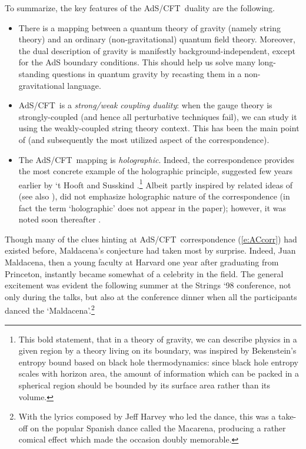 \documentclass[12pt,a4paper]{article}
\def\req#1{(\ref{#1})}
\def\AC{AdS/CFT}
\begin{document}
To summarize, the key features of the \AC\ duality are the following.
\begin{itemize}
\item 
There is a mapping between a quantum theory of gravity (namely string theory) and an ordinary (non-gravitational) quantum field theory.  Moreover, the dual description of gravity is manifestly background-independent, except for the AdS boundary conditions.
This should help us solve many long-standing questions in quantum gravity by recasting them in a non-gravitational language.
\item 
\AC\ is a {\it strong/weak coupling duality}: when the gauge theory is strongly-coupled (and hence all perturbative techniques fail), we can study it using the weakly-coupled string theory context.  This has been the main point of \cite{Maldacena:1997re} (and subsequently the most utilized aspect of the correspondence).
\item
The \AC\ mapping is {\it holographic}.  Indeed, the correspondence  provides the most concrete example of the holographic principle, suggested few years earlier by `t Hooft \cite{tHooft:1993gx} and Susskind \cite{Susskind:1994vu}.\footnote{
This bold statement, that in a theory of gravity, we can describe physics in a given region by a theory living on its boundary, was inspired by Bekenstein's entropy bound \cite{Bekenstein:1993dz} based on black hole thermodynamics: since black hole entropy scales with horizon area, the amount of information which can be packed in a spherical region should be bounded by its surface area rather than its volume.
}
Albeit partly inspired by related ideas of \cite{Polyakov:1997tj} (see also \cite{Polyakov:1998ju}),   \cite{Maldacena:1997re} did not emphasize holographic nature of the correspondence (in fact the term `holographic' does not appear in the paper); however, it was noted soon thereafter \cite{Witten:1998qj,Susskind:1998dq}.

\end{itemize}

Though many of the clues hinting at \AC\ correspondence \req{e:ACcorr} had existed before, Maldacena's conjecture \cite{Maldacena:1997re} had taken most by surprise.  Indeed, Juan Maldacena, then a young faculty at Harvard one year after graduating from Princeton, instantly became somewhat of a celebrity in the field. 
The general excitement was evident the following summer at the Strings `98 conference, not only during the talks, but also at the conference dinner when all the participants danced  the `Maldacena'.\footnote{
With the lyrics composed by Jeff Harvey who led the dance, this was a take-off on the popular Spanish dance called the Macarena, producing a rather comical effect which made the occasion doubly memorable.} 
\end{document}
